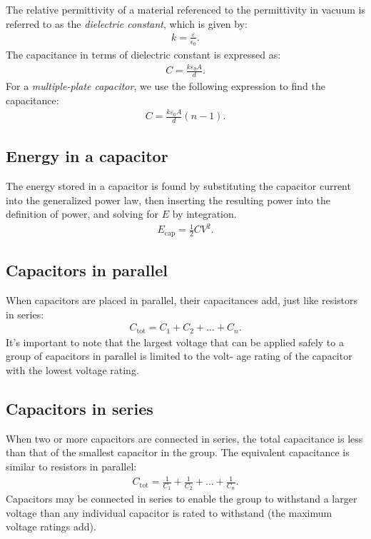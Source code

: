 \documentclass[../../document]{subfiles}
\begin{document}
The relative permittivity of a material referenced to the permittivity in
vacuum is referred to as the \emph{dielectric constant}, which is given by:
\begin{gather}
	k=\frac{\varepsilon}{\epsilon_0}.
\end{gather}
The capacitance in terms of dielectric constant is expressed as:
\begin{gather}
	C = \frac{k\varepsilon_0A}{d}.
\end{gather}
For a \emph{multiple-plate capacitor}, we use the following expression to find the
capacitance: \cite{practical_electronics}
\begin{gather}
	C = \frac{k\varepsilon_0A}{d}(n-1).
\end{gather}

\subsection{Energy in a capacitor}
The energy stored in a capacitor is found by substituting the capacitor current
into the generalized power law, then inserting the resulting power into the
definition of power, and solving for \(E\) by integration.
\cite{practical_electronics}
\begin{gather}
	E_{\text{cap}} = \frac{1}{2}CV^2.
\end{gather}
\subsection{Capacitors in parallel}
When capacitors are placed in parallel, their capacitances add, just like
resistors in series:
\begin{gather}
	C_{\text{tot}} = C_1 + C_2+\dots+C_n.
\end{gather}
It’s important to note that the largest voltage that can be applied safely to a
group of capacitors in parallel is limited to the volt- age rating of the
capacitor with the lowest voltage rating. \cite{practical_electronics}
\subsection{Capacitors in series}
When two or more capacitors are connected in series, the total capacitance is
less than that of the smallest capacitor in the group. The equivalent
capacitance is similar to resistors in parallel:
\begin{gather}
	C_{\text{tot}} = \frac{1}{C_1} + \frac{1}{C_2}+\dots+\frac{1}{C_n}.
\end{gather}
Capacitors may be connected in series to enable the group to withstand a larger
voltage than any individual capacitor is rated to withstand (the maximum
voltage ratings add). \cite{practical_electronics}
\end{document}

